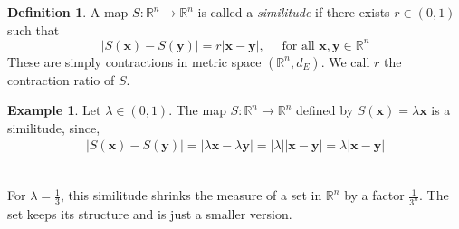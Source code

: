 \documentclass{article}
\theoremstyle{plain}
\theoremstyle{definition}
\newtheorem{defn}[thm]{Definition}
\newtheorem*{ex}{Example}
\theoremstyle{remark}
\begin{document}
\begin{defn}
A map $S: \mathbb{R}^n \to \mathbb{R}^n$ is called a \textit{similitude} if there exists $r \in (0,1)$  such that \[
    |S(\mathbf{x}) - S(\mathbf{y})| = r |\mathbf{x}-\mathbf{y}|, \quad \text{ for all } \mathbf{x}, \mathbf{y} \in \mathbb{R}^n
    \]
    These are simply contractions in metric space $(\mathbb{R}^n, d_E)$. We call $r$ the contraction ratio of $S$.
\end{defn}

\begin{ex}
    Let $\lambda \in (0,1)$. The map $S: \mathbb{R}^n \to \mathbb{R}^n$ defined by $S(\mathbf{x})  = \lambda \mathbf{x}$ is a similitude, since, \begin{align*}
        |S(\mathbf{x}) - S(\mathbf{y})| = |\lambda \mathbf{x} - \lambda \mathbf{y}| = |\lambda| |\mathbf{x} - \mathbf{y}| = \lambda |\mathbf{x} - \mathbf{y}|
    \end{align*}
\end{ex}
~\\
For $\lambda = \frac{1}{3}$, this similitude shrinks the measure of a set in $\mathbb{R}^n$ by a factor $\frac{1}{3^n}$. The set keeps its structure and is just a smaller version.
\end{document}
